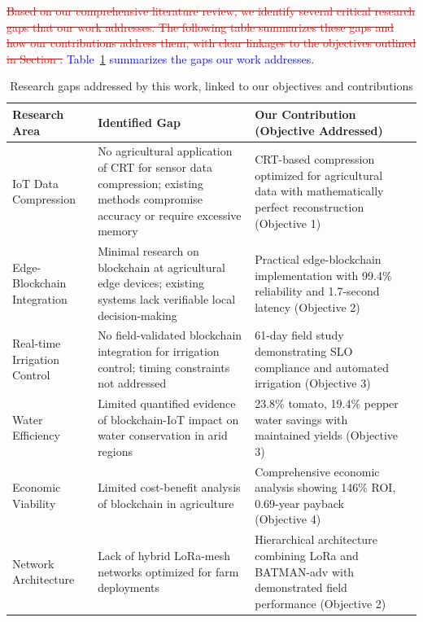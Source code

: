 \documentclass[pdflatex,sn-mathphys-num]{sn-jnl}
\theoremstyle{thmstyleone}
\theoremstyle{thmstyletwo}
\theoremstyle{thmstylethree}
\begin{document}
{\textcolor{red}{\sout{Based on our comprehensive literature review, we identify several critical research gaps that our work addresses. The following table summarizes these gaps and how our contributions address them, with clear linkages to the objectives outlined in Section .}}
\textcolor{blue}{Table~\ref{tab:research_gaps} summarizes the gaps our work addresses.}

\begin{table}[htbp]
\centering
\caption{Research gaps addressed by this work, linked to our objectives and contributions}
\label{tab:research_gaps}
\footnotesize
\begin{tabularx}{\textwidth}{@{}p{}X p{} p{}@{}}
\toprule
\textbf{Research Area} & \textbf{Identified Gap} & \textbf{Our Contribution (Objective Addressed)} \\
\midrule
IoT Data Compression & No agricultural application of CRT for sensor data compression; existing methods compromise accuracy or require excessive memory & CRT-based compression optimized for agricultural data with mathematically perfect reconstruction (Objective 1) \\
\hline
Edge-Blockchain Integration & Minimal research on blockchain at agricultural edge devices; existing systems lack verifiable local decision-making & Practical edge-blockchain implementation with 99.4\% reliability and 1.7-second latency (Objective 2) \\
\hline
Real-time Irrigation Control & No field-validated blockchain integration for irrigation control; timing constraints not addressed & 61-day field study demonstrating SLO compliance and automated irrigation (Objective 3) \\
\hline
Water Efficiency & Limited quantified evidence of blockchain-IoT impact on water conservation in arid regions & 23.8\% tomato, 19.4\% pepper water savings with maintained yields (Objective 3) \\
\hline
Economic Viability & Limited cost-benefit analysis of blockchain in agriculture & Comprehensive economic analysis showing 146\% ROI, 0.69-year payback (Objective 4) \\
\hline
Network Architecture & Lack of hybrid LoRa-mesh networks optimized for farm deployments & Hierarchical architecture combining LoRa and BATMAN-adv with demonstrated field performance (Objective 2) \\
\bottomrule
\end{tabularx}
\end{table}

}
\end{document}
